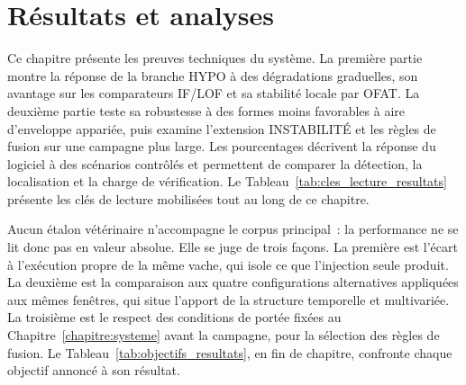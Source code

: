 \chapter{Résultats et analyses}
\label{chapitre:resultats}

Ce chapitre présente les preuves techniques du système. La première partie montre la réponse
de la branche HYPO à des dégradations graduelles, son
avantage sur les comparateurs IF/LOF et sa stabilité locale par OFAT. La deuxième partie
teste sa robustesse à des formes moins favorables à aire d'enveloppe appariée, puis examine l'extension
INSTABILITÉ et les règles de fusion sur une campagne plus large. Les
pourcentages décrivent la réponse du logiciel à des scénarios contrôlés et permettent de
comparer la détection, la localisation et la charge de vérification. Le Tableau~\ref{tab:cles_lecture_resultats}
présente les clés de lecture mobilisées tout au long de ce chapitre.

Aucun étalon vétérinaire n'accompagne le corpus principal~: la performance ne se lit donc pas
en valeur absolue. Elle se juge de trois façons. La première est l'écart à l'exécution propre
de la même vache, qui isole ce que l'injection seule produit. La deuxième est la comparaison
aux quatre configurations alternatives appliquées aux mêmes fenêtres, qui situe l'apport de la
structure temporelle et multivariée. La troisième est le respect des conditions de portée
fixées au Chapitre~\ref{chapitre:systeme} avant la campagne, pour la sélection des règles de
fusion. Le Tableau~\ref{tab:objectifs_resultats}, en fin de chapitre, confronte chaque
objectif annoncé à son résultat.

